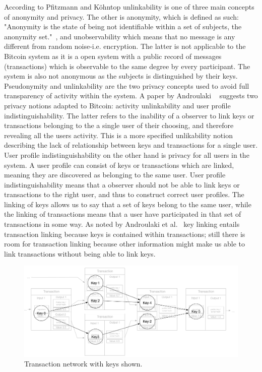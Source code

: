 According to Pfitzmann and Köhntop unlinkability is one of three main concepts of anonymity and privacy. The other is anonymity, which is defined as such: "Anonymity is the state of being not identifiable within a set of subjects, the anonymity set."~\cite{pfitzmann2001anonymity}, and unobservability which means that no message is any different from random noise-i.e. encryption. The latter is not applicable to the Bitcoin system as it is a open system with a public record of messages (transactions) which is observable to the same degree by every participant. The system is also not anonymous as the subjects is distinguished by their keys.
\\

Pseudonymity and unlinkability are the two privacy concepts used to avoid full transparency of activity within the system. A paper by Androulaki ~\cite{androulaki2013evaluating} suggests two privacy notions adapted to Bitcoin: activity unlinkability and user profile indistinguishability. The latter refers to the inability of a observer to link keys or transactions belonging to the a single user of their choosing, and therefore revealing all the users activity. This is a more specified unlikability notion describing the lack of relationship between keys and transactions for a single user. User profile indistinguishability on the other hand is privacy for all users in the system. A user profile can consist of keys or transactions which are linked, meaning they are discovered as belonging to the same user. User profile indistinguishability means that a observer should not be able to link keys or transactions to the right user, and thus to construct correct user profiles. The linking of keys allows us to say that a set of keys belong to the same user, while the linking of transactions means that a user have participated in that set of transactions in some way. As noted by Androulaki et al.~\cite{androulaki2013evaluating} key linking entails transaction linking because keys is contained within transactions; still there is room for transaction linking because other information might make us able to link transactions without being able to link keys. 

\begin{figure}[ht]
    \centering
    \includegraphics[width=14cm]{figures/key_network_related.png}
    \caption{ Transaction network with keys shown.}
    \label{fig:transaction_graph_keys}
\end{figure}

